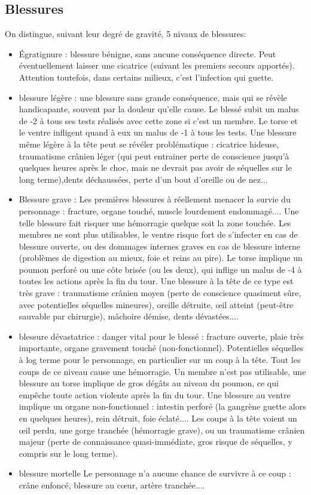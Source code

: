 \documentclass[10pt,a4paper,twocolumn]{book}
\begin{document}
\subsection{Blessures}
On distingue, suivant leur degré de gravité, 5 nivaux de blessures:
\begin{itemize}
\item \'Egratignure : blessure bénigne, sans aucune conséquence directe. Peut éventuellement laisser une cicatrice (suivant les premiers secours apportés). Attention toutefois, dans certains milieux, c'est l'infection qui guette.
\item blessure légère : une blessure sans grande conséquence, mais qui se révèle handicapante, souvent par la douleur qu'elle cause. Le blessé subit un malus de -2 à tous ses tests réalisés avec cette zone si c'est un membre. Le torse et le ventre infligent quand à eux un malus de -1 à tous les tests. Une blessure même légère à la tête peut se révéler problématique : cicatrice hideuse, traumatisme crânien léger (qui peut entrainer perte de conscience jusqu'à quelques heures après le choc, mais ne devrait pas avoir de séquelles sur le long terme),dents déchaussées, perte d'un bout d'oreille ou de nez...
\item Blessure grave : Les premières blessures à réellement menacer la survie du personnage : fracture, organe touché, muscle lourdement endommagé.... Une telle blessure fait risquer une hémorragie quelque soit la zone touchée. Les membres ne sont plus utilisables, le ventre risque fort de s'infecter en cas de blessure ouverte, ou des dommages internes graves en cas de blessure interne (problèmes de digestion au mieux, foie et reins au pire). Le torse implique un poumon perforé ou une côte brisée (ou les deux), qui inflige un malus de -4 à toutes les actions après la fin du tour. Une blessure à la tête de ce type est très grave : traumatisme crânien moyen (perte de conscience quasiment sûre, avec potentielles séquelles mineures), oreille détruite, œil atteint (peut-être sauvable par chirurgie), mâchoire démise, dents dévastées....
\item blessure dévastatrice : danger vital pour le blessé : fracture ouverte, plaie très importante, organe gravement touché (non-fonctionnel). Potentielles séquelles à log terme pour le personnage, en particulier sur un coup à la tête. Tout les coups de ce niveau cause une hémorragie. Un membre n'est pas utilisable, une blessure au torse implique de gros dégâts au niveau du poumon, ce qui empêche toute action violente après la fin du tour. Une blessure au ventre implique un organe non-fonctionnel : intestin perforé (la gangrène guette alors en quelques heures), rein détruit, foie éclaté.... Les coups à la tête voient un œil perdu, une gorge tranchée (hémorragie grave), ou un traumatisme crânien majeur (perte de connaissance quasi-immédiate, gros risque de séquelles, y compris sur le long terme).
\item blessure mortelle Le personnage n'a aucune chance de survivre à ce coup : crâne enfoncé, blessure au cœur, artère tranchée....
\end{itemize}
\end{document}
